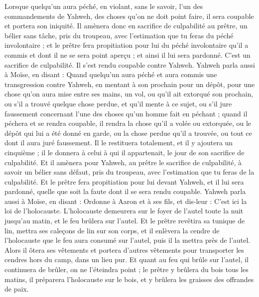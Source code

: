 \begin{multicols}{2}
Lorsque quelqu'un aura péché, en violant, sans le savoir, l'un des commandements de Yahweh, des choses qu'on ne doit point faire, il sera coupable et portera son iniquité.
Il amènera donc en sacrifice de culpabilité au prêtre, un bélier sans tâche, pris du troupeau, avec l'estimation que tu feras du péché involontaire ; et le prêtre fera propitiation pour lui du péché involontaire qu'il a commis et dont il ne se sera point aperçu ; et ainsi il lui sera pardonné.
C'est un sacrifice de culpabilité. Il s'est rendu coupable contre Yahweh.
Yahweh parla aussi à Moïse, en disant :
Quand quelqu'un aura péché et aura commis une transgression contre Yahweh, en mentant à son prochain pour un dépôt, pour une chose qu'on aura mise entre ses mains, un vol, ou qu'il ait extorqué son prochain,
ou s'il a trouvé quelque chose perdue, et qu'il mente à ce sujet, ou s'il jure faussement concernant l'une des choses qu'un homme fait en péchant ;
quand il péchera et se rendra coupable, il rendra la chose qu'il a volée ou extorquée, ou le dépôt qui lui a été donné en garde, ou la chose perdue qu'il a trouvée,
ou tout ce dont il aura juré faussement. Il le restituera totalement, et il y ajoutera un cinquième ; il le donnera à celui à qui il appartenait, le jour de son sacrifice de culpabilité.
Et il amènera pour Yahweh, au prêtre le sacrifice de culpabilité, à savoir un bélier sans défaut, pris du troupeau, avec l'estimation que tu feras de la culpabilité.
Et le prêtre fera propitiation pour lui devant Yahweh, et il lui sera pardonné, quelle que soit la faute dont il se sera rendu coupable. 
\VerseOne{}Yahweh parla aussi à Moïse, en disant :
Ordonne à Aaron et à ses fils, et dis-leur : C'est ici la loi de l'holocauste. L'holocauste demeurera sur le foyer de l'autel toute la nuit jusqu'au matin, et le feu brûlera sur l'autel.
Et le prêtre revêtira sa tunique de lin, mettra ses caleçons de lin sur son corps, et il enlèvera la cendre de l'holocauste que le feu aura consumé sur l'autel, puis il la mettra près de l'autel.
Alors il ôtera ses vêtements et portera d'autres vêtements pour transporter les cendres hors du camp, dans un lieu pur.
Et quant au feu qui brûle sur l'autel, il continuera de brûler, on ne l'éteindra point ; le prêtre y brûlera du bois tous les matins, il préparera l'holocauste sur le bois, et y brûlera les graisses des offrandes de paix.

\end{multicols}
